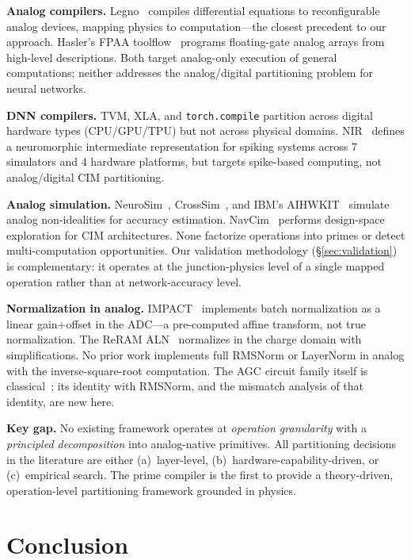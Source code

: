 \documentclass[11pt]{article}
\begin{document}
\textbf{Analog compilers.} Legno~\cite{legno2020} compiles differential equations to reconfigurable analog devices, mapping physics to computation---the closest precedent to our approach. Hasler's FPAA toolflow~\cite{hasler2020} programs floating-gate analog arrays from high-level descriptions. Both target analog-only execution of general computations; neither addresses the analog/digital partitioning problem for neural networks.

\textbf{DNN compilers.} TVM, XLA, and \texttt{torch.compile} partition across digital hardware types (CPU/GPU/TPU) but not across physical domains. NIR~\cite{nir2024} defines a neuromorphic intermediate representation for spiking systems across 7 simulators and 4 hardware platforms, but targets spike-based computing, not analog/digital CIM partitioning.

\textbf{Analog simulation.} NeuroSim~\cite{neurosim}, CrossSim~\cite{crosssim}, and IBM's AIHWKIT~\cite{aihwkit2023} simulate analog non-idealities for accuracy estimation. NavCim~\cite{navcim2024} performs design-space exploration for CIM architectures. None factorize operations into primes or detect multi-computation opportunities. Our validation methodology (\S\ref{sec:validation}) is complementary: it operates at the junction-physics level of a single mapped operation rather than at network-accuracy level.

\textbf{Normalization in analog.} IMPACT~\cite{impact2023} implements batch normalization as a linear gain+offset in the ADC---a pre-computed affine transform, not true normalization. The ReRAM ALN~\cite{reram_aln2022} normalizes in the charge domain with simplifications. No prior work implements full RMSNorm or LayerNorm in analog with the inverse-square-root computation. The AGC circuit family itself is classical~\cite{gilbert1975,pelgrom1989}; its identity with RMSNorm, and the mismatch analysis of that identity, are new here.

\textbf{Key gap.} No existing framework operates at \textit{operation granularity} with a \textit{principled decomposition} into analog-native primitives. All partitioning decisions in the literature are either (a)~layer-level, (b)~hardware-capability-driven, or (c)~empirical search. The prime compiler is the first to provide a theory-driven, operation-level partitioning framework grounded in physics.

\section{Conclusion}
\end{document}
